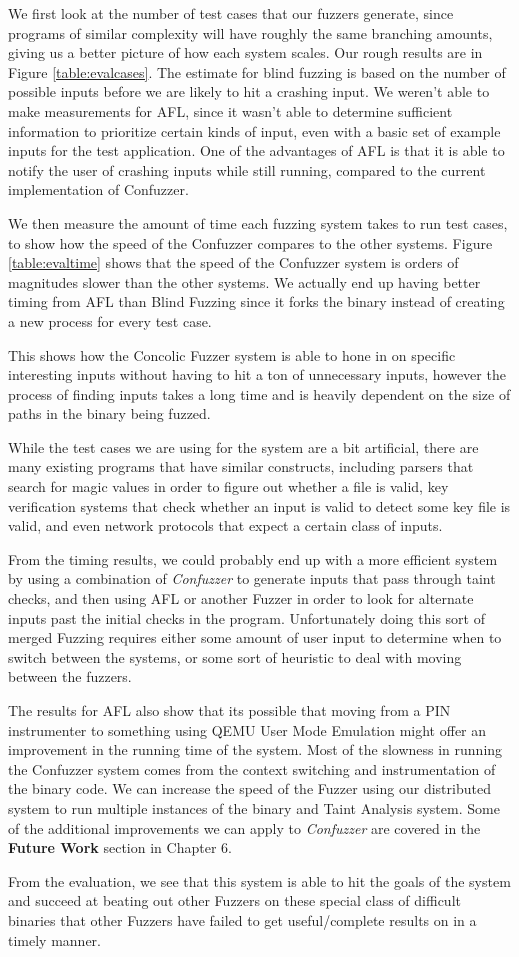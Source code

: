 We first look at the number of test cases that our fuzzers generate, since
programs of similar complexity will have roughly the same branching amounts,
giving us a better picture of how each system scales. Our rough results are in
Figure \ref{table:evalcases}. The estimate for blind fuzzing is based on the
number of possible inputs before we are likely to hit a crashing input. We
weren't able to make measurements for AFL, since it wasn't able to determine
sufficient information to prioritize certain kinds of input, even with a basic
set of example inputs for the test application. One of the advantages of AFL is
that it is able to notify the user of crashing inputs while still running,
compared to the current implementation of Confuzzer.

We then measure the amount of time each fuzzing system takes to run test cases,
to show how the speed of the Confuzzer compares to the other systems. Figure
\ref{table:evaltime} shows that the speed of the Confuzzer system is orders of
magnitudes slower than the other systems. We actually end up having better
timing from AFL than Blind Fuzzing since it forks the binary instead of creating
a new process for every test case.

This shows how the Concolic Fuzzer system is able to hone in on specific
interesting inputs without having to hit a ton of unnecessary inputs, however
the process of finding inputs takes a long time and is heavily dependent on the
size of paths in the binary being fuzzed.

While the test cases we are using for the system are a bit artificial, there are
many existing programs that have similar constructs, including parsers that
search for magic values in order to figure out whether a file is valid, key
verification systems that check whether an input is valid to detect some key
file is valid, and even network protocols that expect a certain class of inputs.

From the timing results, we could probably end up with a more efficient system
by using a combination of \textit{Confuzzer} to generate inputs that pass
through taint checks, and then using AFL or another Fuzzer in order to look for
alternate inputs past the initial checks in the program. Unfortunately doing
this sort of merged Fuzzing requires either some amount of user input to
determine when to switch between the systems, or some sort of heuristic to deal
with moving between the fuzzers.

The results for AFL also show that its possible that moving from a PIN
instrumenter to something using QEMU User Mode Emulation might offer an
improvement in the running time of the system. Most of the slowness in running
the Confuzzer system comes from the context switching and instrumentation of the
binary code. We can increase the speed of the Fuzzer using our distributed
system to run multiple instances of the binary and Taint Analysis system. Some
of the additional improvements we can apply to \textit{Confuzzer} are covered in
the \textbf{Future Work} section in Chapter 6.

From the evaluation, we see that this system is able to hit the goals of the
system and succeed at beating out other Fuzzers on these special class of
difficult binaries that other Fuzzers have failed to get useful/complete results
on in a timely manner.